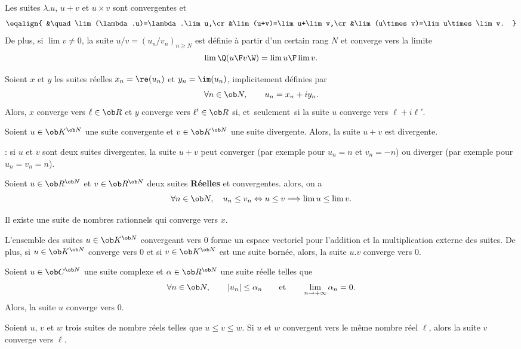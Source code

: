 Les suites $\lambda.u$, $u+v$ et $u\times v$ sont convergentes et 
$$
\eqalign{
&\quad\lim(\lambda.u)=\lambda.\lim u,\cr
&\lim(u+v)=\lim u+\lim v,\cr
&\lim(u\times v)=\lim u\times\lim v.
}
$$
De plus, si $\lim v\neq 0$, la suite $u/v=(u_n/v_n)_{n\ge N}$ est définie à partir d'un certain rang $N$ et converge vers la limite 
$$
{\lim\Q({u\F v}\W)={\lim u\F\lim v}}.
$$

Soient $x$ et $y$  les suites réelles $x_n=\re(u_n)$ et $y_n=\im(u_n)$, implicitement définies par
$$
\forall n\in\ob N,\qquad u_n=x_n+iy_n.
$$
Alors, $x$ converge vers $\ell\in\ob R$ et $y$ converge vers $\ell'\in\ob R$ si, et~seulement~si la suite $u$ converge vers $\ell+i\ell'$. 

\Propriete []  Soient $u\in\ob K^{\ob N}$ une suite convergente et $v\in\ob K^{\ob N}$ une suite divergente. Alors, la suite $u+v$ est divergente. 
\bigskip

\Remarque : si $u$ et $v$ sont deux suites divergentes, la suite $u+v$ peut converger (par exemple pour $u_n=n$ et $v_n=-n$) ou diverger (par exemple pour $u_n=v_n=n$). 
\bigskip


\Propriete [Title=Conservation des inégalités larges par passage à la limite]
Soient $u\in\ob R^{\ob N}$ et $v\in\ob R^{\ob N}$ deux suites 
{\bf Réelles} et convergentes. alors, on a 
$$
\forall n\in\ob N, \quad u_n\le v_n\Leftrightarrow u\le v\Longrightarrow \lim u\le \lim v. 
$$ 


Il existe une suite de nombres rationnels qui converge vers $x$. 

\Propriete []  L'ensemble des suites $u\in\ob K^{\ob N}$ convergeant vers $0$ forme un espace vectoriel pour l'addition et la multiplication externe des suites. 
De plus, si $u\in\ob K^{\ob N}$ converge vers $0$ et si $v\in\ob K^{\ob N}$ est une suite bornée, alors, la suite $u.v$ converge vers $0$. 
\bigskip


\Propriete []  Soient $u\in\ob C^{\ob N}$ une suite complexe et $\alpha\in\ob R^{\ob N}$ une suite réelle telles que 
$$
\forall n\in\ob N, \qquad |u_n|\le \alpha_n\qquad \mbox{et}\qquad \lim_{n\to+\infty}\alpha_n=0.
$$
Alors, la suite $u$ converge vers $0$. 
\bigskip


\Propriete [Title=Principe des gendarmes]
Soient $u$, $v$ et $w$ trois suites de nombre réels telles que $u\le v\le w$. Si $u$ et $w$ convergent vers le même nombre réel $\ell$, alors la suite $v$ converge vers $\ell$. 
\bigskip


